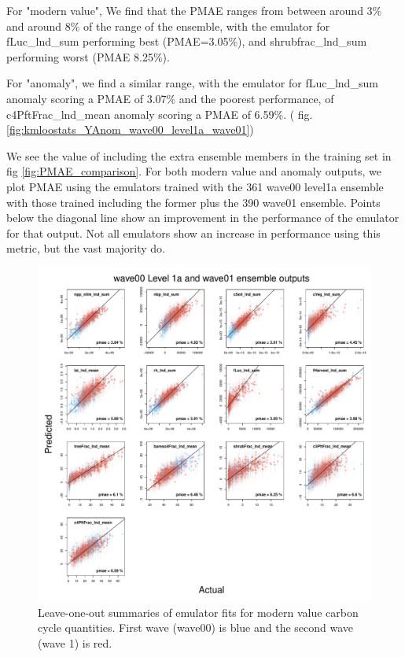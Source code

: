 \documentclass[gmd, manuscript]{copernicus}
\begin{document}
For "modern value", We find that the PMAE ranges from between around 3\% and around 8\% of the range of the ensemble, with the emulator for fLuc\_lnd\_sum performing best (PMAE=3.05\%), and shrubfrac\_lnd\_sum performing worst (PMAE  8.25\%).

For "anomaly", we find a similar range, with the emulator for fLuc\_lnd\_sum anomaly scoring a PMAE of 3.07\% and the poorest performance, of c4PftFrac\_lnd\_mean anomaly scoring a PMAE of 6.59\%.  ( fig.  \ref{fig:kmloostats_YAnom_wave00_level1a_wave01}) 

We see the value of including the extra ensemble members in the training set in fig \ref{fig:PMAE_comparison}. For both modern value and anomaly outputs, we plot PMAE using the emulators trained with the 361 wave00 level1a ensemble with those trained including the former plus the 390 wave01 ensemble. Points below the diagonal line show an improvement in the performance of the emulator for that output. Not all emulators show an increase in performance using this metric, but the vast majority do.

%
\begin{figure}[ht]
\includegraphics[width=12cm]{./figs/figA01.pdf}
\caption{Leave-one-out summaries of emulator fits for modern value carbon cycle quantities. First wave (wave00) is blue and the second wave (wave 1) is red. }
\label{fig:kmloostats_Y_wave00_level1a_wave01}
\end{figure}
\end{document}

